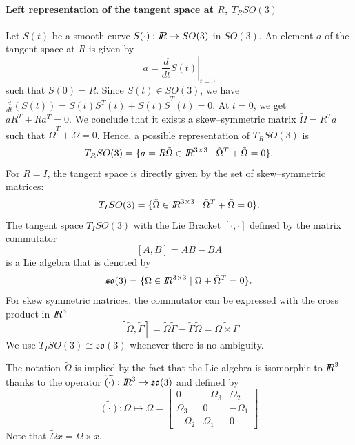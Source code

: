 \paragraph{Left representation of  the tangent space at $R$, $T_RSO(3)$ } Let $S(t)$ be a smooth curve $S(\cdot) : \mbox{\rm $I\!\!R$}  \rightarrow SO(3)$ in $SO(3)$. An element $a$ of the tangent space at $R$ is given by
\begin{equation}
  \label{eq:174}
  a  = \left.\frac{d}{dt} S(t)\right|_{t=0}
\end{equation}
such that $S(0)= R$.
Since $S(t)\in SO(3)$, we have  $\frac{d}{dt} (S(t)) = \dot S(t)S^T(t) +  S(t) \dot S^T(t) =0$. At $t=0$, we get $a R^T +  R a^T =0$.
We conclude that it exists a skew--symmetric matrix $\tilde \Omega = R^T a$ such that $\tilde \Omega^T + \tilde \Omega =0$. Hence, a possible representation of  $T_RSO(3)$ is
\begin{equation}
  \label{eq:49}
  T_RSO(3) = \{ a = R \tilde \Omega \in \mbox{\rm $I\!\!R$}^{3\times 3} \mid \tilde \Omega^T + \tilde \Omega =0 \}.
\end{equation}
For $R=I$, the tangent space is directly given by the set of  skew--symmetric matrices:
\begin{equation}
  \label{eq:50}
  T_ISO(3) = \{ \tilde \Omega\in \mbox{\rm $I\!\!R$}^{3\times 3} \mid \tilde \Omega^T + \tilde \Omega =0 \}.
\end{equation}
The tangent space $T_ISO(3)$ with the Lie Bracket $[\cdot,\cdot]$ defined by the matrix commutator
\begin{equation}
  \label{eq:51}
  [A,B] = AB-BA
\end{equation}
is a Lie algebra that is denoted by
\begin{equation}
  \label{eq:53}
  \mathfrak{so}(3) =\{\Omega\in \mbox{\rm $I\!\!R$}^{3\times 3} \mid \Omega + \tilde \Omega^T =0\}.
\end{equation}
 For skew symmetric matrices, the commutator can be expressed with the cross product in $\mbox{\rm $I\!\!R$}^3$
\begin{equation}
  \label{eq:52}
  [\tilde \Omega, \tilde \Gamma] = \tilde \Omega \tilde \Gamma - \tilde \Gamma \tilde \Omega= \widetilde{\Omega \times \Gamma }
\end{equation}
We use   $T_ISO(3) \cong  \mathfrak{so}(3)$ whenever there is no ambiguity.

The notation $\tilde \Omega$ is implied by the fact that the Lie algebra is isomorphic to $\mbox{\rm $I\!\!R$}^3$ thanks to the operator $\widetilde{(\cdot)} :\mbox{\rm $I\!\!R$}^3 \rightarrow \mathfrak{so}(3)$ and defined by
\begin{equation}
  \label{eq:54}
 \widetilde{(\cdot)}: \Omega \mapsto \tilde \Omega =
  \begin{bmatrix}
    0 & -\Omega_3 & \Omega_2 \\
    \Omega_3 & 0 & -\Omega_1 \\
    -\Omega_2  & \Omega_1 & 0
  \end{bmatrix}
\end{equation}
Note that $\tilde \Omega x = \Omega \times x$.

